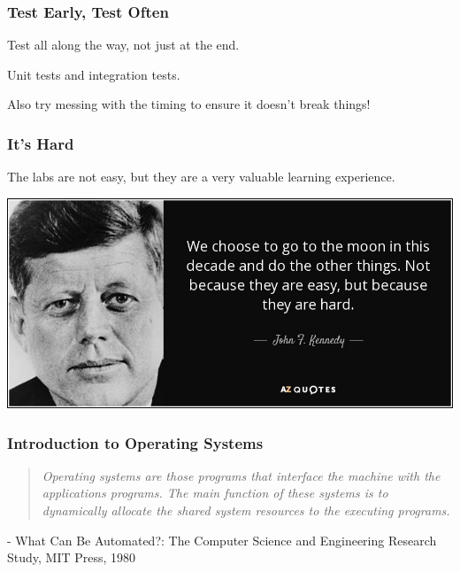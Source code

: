 \begin{frame}
\frametitle{Test Early, Test Often}

Test all along the way, not just at the end.

Unit tests and integration tests.

Also try messing with the timing to ensure it doesn't break things!

\end{frame}

\begin{frame}
\frametitle{It's Hard}

The labs are not easy, but they are a very valuable learning experience.

\begin{center}
	\includegraphics[width=\textwidth]{images/worthit.jpg}
\end{center}

\end{frame}

\begin{frame}
\frametitle{Introduction to Operating Systems}

\begin{quote}
\textit{Operating systems are those programs that interface the machine with the applications programs. The main function of these systems is to dynamically allocate the shared system resources to the executing programs.}
\end{quote}

\hfill - What Can Be Automated?: The Computer Science and Engineering Research Study, MIT Press, 1980

\end{frame}


